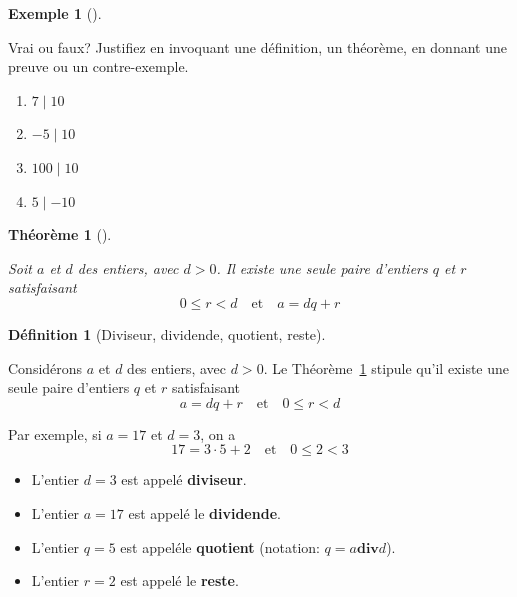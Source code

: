 \documentclass[
  letterpaper,
]{scrbook}
\providecommand{\tightlist}{%
  \setlength{\itemsep}{0pt}\setlength{\parskip}{0pt}}\usepackage{longtable,booktabs,array}
\theoremstyle{plain}
\newtheorem{theorem}{Théorème}[chapter]
\theoremstyle{definition}
\newtheorem{example}{Exemple}[chapter]
\theoremstyle{definition}
\newtheorem{definition}{Définition}[chapter]
\theoremstyle{remark}
\begin{document}
\leavevmode{}%
\begin{example}[]\label{exm-vrai-faux-divisibilite}

Vrai ou faux? Justifiez en invoquant une définition, un théorème, en
donnant une preuve ou un contre-exemple.

\begin{enumerate}
\def\labelenumi{\alph{enumi})}
\tightlist
\item
  \(7\mid 10\)
\item
  \(-5\mid 10\)
\item
  \(100\mid 10\)
\item
  \(5\mid -10\)
\end{enumerate}

\end{example}

\leavevmode{}%
\begin{theorem}[]\label{thm-une-seule-paire-entiers}

Soit \(a\) et \(d\) des entiers, avec \(d>0\). Il existe une seule paire
d'entiers \(q\) et \(r\) satisfaisant \[
0\leq r<d \quad \text{et} \quad a=dq+r
\]

\end{theorem}

\leavevmode{}%
\begin{definition}[Diviseur, dividende, quotient,
reste]\label{def-diviseur-dividende-quotient-reste}

Considérons \(a\) et \(d\) des entiers, avec \(d>0\). Le
Théorème~\ref{thm-une-seule-paire-entiers} stipule qu'il existe une
seule paire d'entiers \(q\) et \(r\) satisfaisant \[
a=dq+r \quad \text{et} \quad 0\leq r<d
\]

Par exemple, si \(a=17\) et \(d=3\), on a \[
17=3\cdot 5+2 \quad \text{et} \quad 0\leq 2<3
\]

\begin{itemize}
\tightlist
\item
  L'entier \(d=3\) est appelé \textbf{diviseur}.
\item
  L'entier \(a=17\) est appelé le \textbf{dividende}.
\item
  L'entier \(q=5\) est appeléle \textbf{quotient} (notation:
  \(q=a\mathbf{div} d\)).
\item
  L'entier \(r=2\) est appelé le \textbf{reste}.
\end{itemize}

\end{definition}
\end{document}
